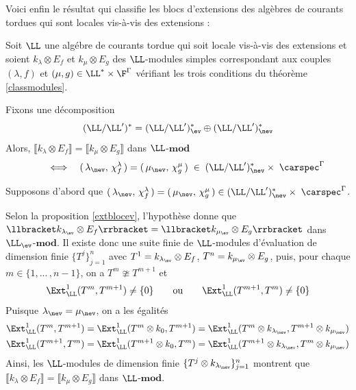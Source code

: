 Voici enfin le résultat qui classifie les blocs d'extensions des algèbres de courants tordues qui sont locales vis-à-vis des extensions : 

\begin{Thm} Soit $\LL$ une algébre de courants tordue qui soit locale vis-à-vis des extensions et soient $k_\lambda \otimes E_f$ et $k_\mu \otimes E_g$ des $\LL$-modules simples correspondant aux couples $(\lambda,f)$ et $(\mu,g) \in \LL^* \times \F^\Gamma$ vérifiant les trois conditions du théorème \ref{classmodules}.

Fixons une décomposition 
$$ (\LL/\LL')^* = (\LL/\LL')_{\ev}^* \oplus (\LL/\LL')_{\nev}^* $$
Alors, $\llbracket k_\lambda \otimes E_f \rrbracket = \llbracket k_\mu \otimes E_g \rrbracket$ dans $\LL$-$\mathbf{mod}$
$$ \qquad \Longleftrightarrow \quad (\,\lambda_{\nev},\,\chi_f^\lambda\,) = (\,\mu_{\nev},\,\chi_g^\mu\,) \;\in\; (\LL/\LL')_{\nev}^* \times \; \carspec^\Gamma $$
\begin{pre} Supposons d'abord que $(\,\lambda_{\nev},\,\chi_f^\lambda\,) = (\,\mu_{\nev},\,\chi_g^\mu\,) \in (\LL/\LL')_{\nev}^* \times \; \carspec^\Gamma$. 

Selon la proposition \ref{extblocev}, l'hypothèse donne que $\llbracket k_{\lambda_{\ev}} \otimes E_f \rrbracket = \llbracket k_{\mu_{\ev}} \otimes E_g \rrbracket$ dans $\LL_{\ev}$-$\mathbf{mod}$. Il existe donc une suite finie de $\LL$-modules d'évaluation de dimension finie $\{T^j\}_{j=1}^n$ avec \linebreak $T^1 = k_{\lambda_{\ev}} \otimes E_f$, $T^n = k_{\mu_{\ev}} \otimes E_g$, puis, pour chaque $m \in \{1,...\,,n-1\}$, on a $T^m \ncong T^{m+1}$ et
$$ \Ext^1_\LL(T^m,T^{m+1}) \neq \{0\} \qquad \text{ou} \qquad \Ext^1_\LL(T^{m+1},T^m) \neq \{0\} $$
Puisque $\lambda_{\nev} = \mu_{\nev}$, on a les égalités
\begin{align*} 
\Ext^1_\LL(T^m,T^{m+1}) &= \Ext^1_\LL(T^m \otimes k_0,T^{m+1}) = \Ext^1_\LL(T^m \otimes k_{\lambda_{\nev}},T^{m+1} \otimes k_{\mu_{\nev}})\\
\Ext^1_\LL(T^{m+1},T^m) &= \Ext^1_\LL(T^{m+1} \otimes k_0,T^m) = \Ext^1_\LL(T^{m+1} \otimes k_{\lambda_{\nev}},T^m \otimes k_{\mu_{\nev}})
\end{align*}
Ainsi, les $\LL$-modules de dimension finie $\{T^j \otimes k_{\lambda_{\nev}}\}_{j=1}^n$ montrent que $\llbracket k_\lambda \otimes E_f \rrbracket = \llbracket k_\mu \otimes E_g \rrbracket$ dans $\LL$-$\mathbf{mod}$.


\end{pre}
\end{Thm}
